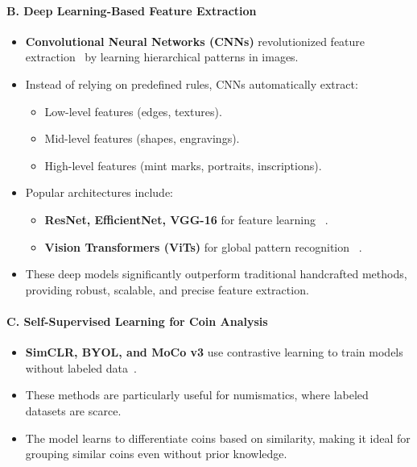 \documentclass[nolibertine, english, algorithm, nomencl, minted]{ttlab-qualify}
\begin{document}
\paragraph{B. Deep Learning-Based Feature Extraction}
\begin{itemize}
    \item {\bfseries Convolutional Neural Networks (CNNs)} revolutionized feature extraction~\parencite{lecun1998cnn} by learning hierarchical patterns in images.
    \item Instead of relying on predefined rules, CNNs automatically extract:
    \begin{itemize}
        \item Low-level features (edges, textures).
        \item Mid-level features (shapes, engravings).
        \item High-level features (mint marks, portraits, inscriptions).
    \end{itemize}

    \item Popular architectures include: \begin{itemize}
        \item {\bfseries ResNet, EfficientNet, VGG-16} for feature learning ~\parencite{he2016resnet, tan2019efficientnet, simonyan2015vgg}.
        \item {\bfseries Vision Transformers (ViTs)} for global pattern recognition ~\parencite{dosovitskiy2021vit}.
    \end{itemize}
    \item These deep models significantly outperform traditional handcrafted methods, providing robust, scalable, 
    and precise feature extraction.
\end{itemize}


\paragraph{C. Self-Supervised Learning for Coin Analysis}
\begin{itemize}
    \item {\bfseries SimCLR, BYOL, and MoCo v3} use contrastive learning to train models without labeled data~\parencite{chen2020simclr, grill2020byol, chen2021mocov3}.
    \item These methods are particularly useful for numismatics, where labeled datasets are scarce.
    \item The model learns to differentiate coins based on similarity, making it ideal for grouping similar coins even without prior knowledge.
\end{itemize}
\end{document}
